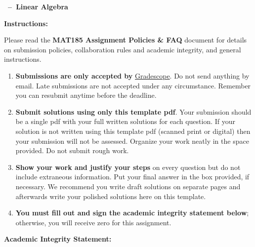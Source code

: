 \documentclass[10pt,addpoints,answers]{exam}
\begin{document}
\vspace*{-0.5cm}
\begin{center}
  \large
  \textbf{\Large \course~--~Linear Algebra}\\[0.1cm]
  \textbf{\assignmenttitle}
\end{center}
\bigskip

\textbf{\large Instructions:}\\
\normalsize

Please read the {\bf MAT185 Assignment Policies \& FAQ} document for details on
submission policies, collaboration rules and academic integrity, and general
instructions.

\begin{enumerate}


\item \textbf{Submissions are only accepted by}
  \href{https://www.gradescope.ca}{Gradescope}. Do not send anything by email.
  Late submissions are not accepted under any circumstance. Remember you can
  resubmit anytime before the deadline.

\item \textbf{Submit solutions using only this template pdf}.  Your submission
  should be a single pdf with your full written solutions for each question. If
  your solution is not written using this template pdf (scanned print or
  digital) then your submission will not be assessed. Organize your work neatly
  in the space provided.  Do not submit rough work.

\item \textbf{Show your work and justify your steps} on every question but do
  not include extraneous information.  Put your final answer in the box
  provided, if necessary.  We recommend you write draft solutions on separate
  pages and afterwards write your polished solutions here on this template.

\item \textbf{You must fill out and sign the academic integrity statement
    below}; otherwise, you will receive zero for this assignment.

\end{enumerate}

\vspace{10pt}


\textbf{\large Academic Integrity Statement:} \\


\end{document}
